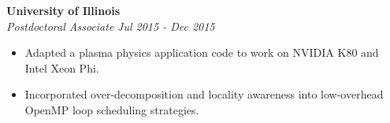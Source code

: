 {\noindent
\textbf{University of Illinois}\\
\textit{Postdoctoral Associate} \hfill \textit{Jul 2015 - Dec 2015}
\vspace*{-0.02in}
\begin{itemize} 
\item Adapted a plasma physics application code to work on NVIDIA K80 and Intel Xeon Phi.
\item Incorporated over-decomposition and locality awareness into low-overhead OpenMP loop scheduling strategies. 
\end{itemize}

}
